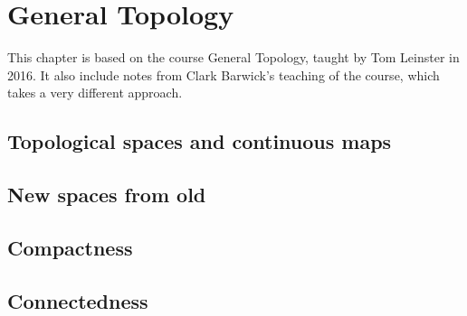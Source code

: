 \chapter{General Topology}\label{cha:general-topology}
This chapter is based on the course General Topology, taught by Tom Leinster in 2016. It also include notes from Clark Barwick's teaching of the course, which takes a very different approach.

\section{Topological spaces and continuous maps}

\section{New spaces from old}

\section{Compactness}

\section{Connectedness}

